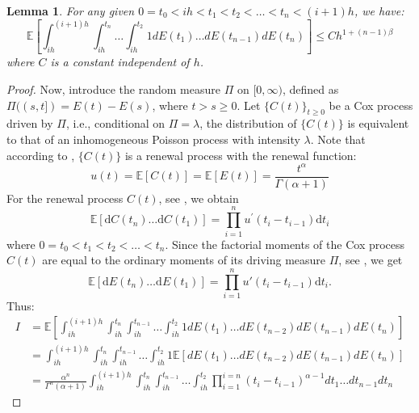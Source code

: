 \documentclass[10pt,reqno,final]{amsart}
\theoremstyle{plain}
\newtheorem{lemma}{Lemma}[section]
\theoremstyle{definition}
\theoremstyle{remark}
\numberwithin{equation}{section}
\numberwithin{figure}{section}
\numberwithin{table}{section}
\begin{document}
\begin{lemma}\label{main lemma}
	For any given $0 = t_0 < ih < t_1 < t_2 < \ldots < t_n < (i+1)h$, we have:
	\begin{equation}
		\mathbb{E}\left[\int_{ih}^{(i+1)h}
		\int_{ih}^{t_n} \ldots \int_{ih}^{t_2} 1 dE(t_1) \ldots dE(t_{n-1}) dE(t_n)\right] \le Ch^{1+(n-1)\beta}
	\end{equation}
	where \(C\) is a constant independent of \(h\).
\end{lemma}

\begin{proof}
	Now, introduce the random measure \(\Pi\) on \([0, \infty)\), defined as \(\Pi((s, t]) = E(t) - E(s)\), where \(t > s \geq 0\). Let \(\{C(t)\}_{t \geq 0}\) be a Cox process driven by \(\Pi\), i.e., conditional on \(\Pi = \lambda\), the distribution of \(\{C(t)\}\) is equivalent to that of an inhomogeneous Poisson process with intensity \(\lambda\). Note that according to \cite{kingman1964doubly}, \(\{C(t)\}\) is a renewal process with the renewal function:
	\begin{equation}
		u(t) = \mathbb{E}[C(t)] = \mathbb{E}[E(t)] = \frac{t^\alpha}{\Gamma(\alpha+1)}
	\end{equation}
	For the renewal process \(C(t)\), see \cite{daley2003introduction}, we obtain
	\begin{equation*}
		\mathbb{E}[\mathrm{d}C(t_n)\ldots \mathrm{d}C(t_1)] = \prod_{i=1}^n u^{\prime}(t_i - t_{i-1})\mathrm{d}t_i
	\end{equation*}
	where \(0 = t_0 < t_1 < t_2 < \ldots < t_n\). Since the factorial moments of the Cox process \(C(t)\) are equal to the ordinary moments of its driving measure \(\Pi\), see \cite{daley2003introduction}, we get
	\begin{equation*}
		\mathbb{E}[\mathrm dE(t_n)\ldots \mathrm dE(t_1)] = \prod_{i=1}^n u'(t_i - t_{i-1})\mathrm d t_i.
	\end{equation*}
	Thus:
	\begin{align*}
		I &= \mathbb{E}\left[\int_{ih}^{(i+1)h}
		\int_{ih}^{t_n}\int_{ih}^{t_{n-1}} \ldots \int_{ih}^{t_{2}} 1 dE(t_1) \ldots dE(t_{n-2}) dE(t_{n-1}) dE(t_n)\right] \\
		&= \int_{ih}^{(i+1)h}\int_{ih}^{t_n}\int_{ih}^{t_{n-1}}
		\ldots \int_{ih}^{t_{2}} 1 \mathbb{E}\left[dE(t_1) \ldots dE(t_{n-2}) dE(t_{n-1}) dE(t_n)\right] \\
		&= \frac{\alpha^n}{\Gamma^n(\alpha+1)}
		\int_{ih}^{(i+1)h}\int_{ih}^{t_n}\int_{ih}^{t_{n-1}} \ldots \int_{ih}^{t_{2}} \prod_{i=1}^{i=n} (t_i - t_{i-1})^{\alpha -1} d t_1 \ldots d t_{n-1} d t_n

\end{align*}
\end{proof}
\end{document}
